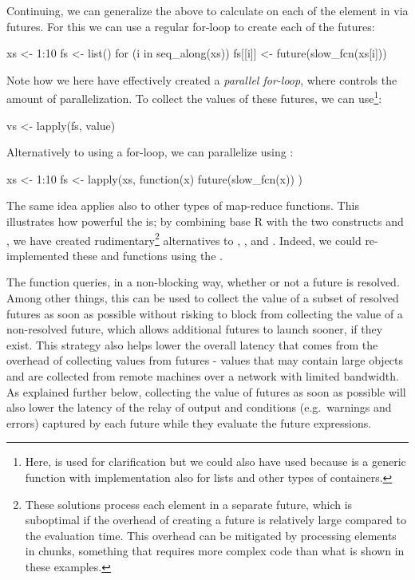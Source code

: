 Continuing, we can generalize the above to
calculate  on each of the element in  via
futures. For this we can use a regular for-loop to create each of
the  futures:
\begin{example}
xs <- 1:10
fs <- list()
for (i in seq_along(xs)) {
  fs[[i]] <- future(slow_fcn(xs[i]))
}
\end{example}
Note how we here have effectively created a \emph{parallel for-loop},
where  controls the amount of parallelization.  To
collect the values of these futures, we can
use\footnote{Here,  is used for
clarification but we could also have used 
because  is a generic function with implementation also
for lists and other types of containers.}:
\begin{example}
vs <- lapply(fs, value)
\end{example}
%
Alternatively to using a for-loop, we can parallelize
using :
\begin{example}
xs <- 1:10
fs <- lapply(xs, function(x) {
  future(slow_fcn(x))
})
\end{example}
%
The same idea applies also to other types of map-reduce functions.
This illustrates how powerful the  is; by combining
base R with the two constructs  and , we
have created rudimentary\footnote{These solutions process each element
in a separate future, which is suboptimal if the overhead of creating
a future is relatively large compared to the evaluation time. This
overhead can be mitigated by processing elements in chunks, something
that requires more complex code than what is shown in these examples.}
alternatives to , ,
and .  Indeed, we could re-implemented
these  and  functions using the .

The  function queries, in a non-blocking way, whether
or not a future is resolved.  Among other things, this can be used to
collect the value of a subset of resolved futures as soon as possible
without risking to block from collecting the value of a non-resolved
future, which allows additional futures to launch sooner, if they
exist.  This strategy also helps lower the overall latency that comes
from the overhead of collecting values from futures - values that may
contain large objects and are collected from remote machines over a
network with limited bandwidth.  As explained further below,
collecting the value of futures as soon as possible will also lower
the latency of the relay of output and conditions (e.g.\ warnings and
errors) captured by each future while they evaluate the future
expressions.

